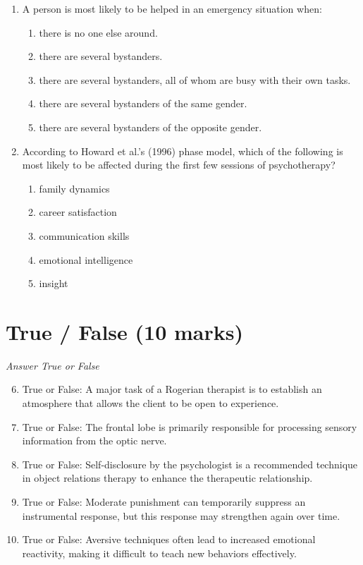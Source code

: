 \documentclass[12pt]{article}
\begin{document}
\begin{enumerate}[label=\arabic*.]
\item A person is most likely to be helped in an emergency situation when:
\begin{enumerate}[label=(\alph*)]
    \item there is no one else around.
    \item there are several bystanders.
    \item there are several bystanders, all of whom are busy with their own tasks.
    \item there are several bystanders of the same gender.
    \item there are several bystanders of the opposite gender.
\end{enumerate}
\item According to Howard et al.'s (1996) phase model, which of the following is most likely to be affected during the first few sessions of psychotherapy?
\begin{enumerate}[label=(\alph*)]
    \item family dynamics
    \item career satisfaction
    \item communication skills
    \item emotional intelligence
    \item insight
\end{enumerate}
\end{enumerate}

\section*{True / False (10 marks)}
\textit{Answer True or False}
\begin{enumerate}[label=\arabic*.]
\setcounter{enumi}{5}
\item True or False: A major task of a Rogerian therapist is to establish an atmosphere that allows the client to be open to experience.
\item True or False: The frontal lobe is primarily responsible for processing sensory information from the optic nerve.
\item True or False: Self-disclosure by the psychologist is a recommended technique in object relations therapy to enhance the therapeutic relationship.
\item True or False: Moderate punishment can temporarily suppress an instrumental response, but this response may strengthen again over time.
\item True or False: Aversive techniques often lead to increased emotional reactivity, making it difficult to teach new behaviors effectively.
\end{enumerate}
\end{document}
